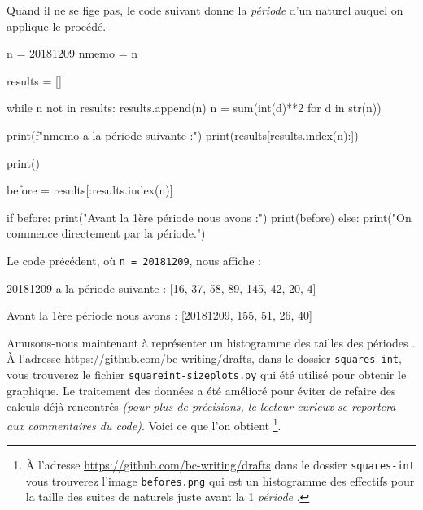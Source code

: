 Quand il ne se fige pas, le code suivant donne la \textit{\og période \fg} d'un naturel auquel on applique le procédé.

\begin{rawcode}
n     = 20181209
nmemo = n

results = []

while n not in results:
    results.append(n)
    n = sum(int(d)**2 for d in str(n))

print(f"{nmemo} a la période suivante :")
print(results[results.index(n):])

print()

before = results[:results.index(n)]

if before:
    print("Avant la 1ère période nous avons :")
    print(before)
else:
    print("On commence directement par la période.")
\end{rawcode}

\medskip

Le code précédent, où \verb+n = 20181209+, nous affiche :

\begin{rawcode}
20181209 a la période suivante :
[16, 37, 58, 89, 145, 42, 20, 4]

Avant la 1ère période nous avons :
[20181209, 155, 51, 26, 40]
\end{rawcode}


\medskip

Amusons-nous maintenant à représenter un histogramme des tailles des \og périodes \fg{}.
À l'adresse \url{https://github.com/bc-writing/drafts}, dans le dossier \texttt{squares-int}, vous trouverez le fichier \texttt{squareint-sizeplots.py} qui été utilisé pour obtenir le graphique.
Le traitement des données a été amélioré pour éviter de refaire des calculs déjà rencontrés \emph{(pour plus de précisions, le lecteur curieux se reportera aux commentaires du code)}.
Voici ce que l'on obtient
\footnote{
	À l'adresse \url{https://github.com/bc-writing/drafts} dans le dossier \texttt{squares-int} vous trouverez l'image \texttt{befores.png} qui est un histogramme des effectifs pour la taille des suites de naturels juste avant la 1\iere{} \emph{\og période \fg{}}.
}.

